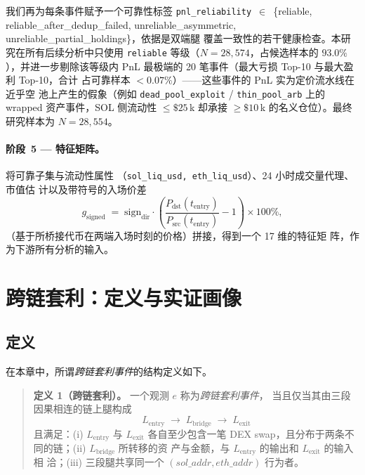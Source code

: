 \documentclass[11pt,a4paper]{ctexart}
\newcommand{\gsigned}{g_{\text{signed}}}
\begin{document}
我们再为每条事件赋予一个可靠性标签
\texttt{pnl\_reliability}~$\in$~\{reliable, reliable\_after\_dedup\_failed,
unreliable\_asymmetric, unreliable\_partial\_holdings\}，依据是双端腿
覆盖一致性的若干健康检查。本研究在所有后续分析中只使用 \texttt{reliable}
等级（$N=28{,}574$，占候选样本的 $93.0\%$），并进一步剔除该等级内
PnL 最极端的 20 笔事件（最大亏损 Top-10 与最大盈利 Top-10，合计
占可靠样本 $<\!0.07\%$）——这些事件的 PnL 实为定价流水线在近乎空
池上产生的假象（例如 \texttt{dead\_pool\_exploit} /
\texttt{thin\_pool\_arb} 上的 wrapped 资产事件，SOL 侧流动性
$\leq\!\$25$\,k 却承接 $\geq\!\$10$\,k 的名义仓位）。最终研究样本为
$N = 28{,}554$。

\paragraph{阶段~5 --- 特征矩阵。} 将可靠子集与流动性属性
（\texttt{sol\_liq\_usd, eth\_liq\_usd}）、24 小时成交量代理、市值估
计以及带符号的入场价差
\begin{equation}
\label{eq:ch4-gsigned}
    \gsigned \;=\; \mathrm{sign}_{\text{dir}}\cdot
    \left(\frac{P_{\text{dst}}(t_{\text{entry}})}{P_{\text{src}}(t_{\text{entry}})}-1\right)
    \times 100\%,
\end{equation}
（基于所桥接代币在两端入场时刻的价格）拼接，得到一个 17 维的特征矩
阵，作为下游所有分析的输入。

\section{跨链套利：定义与实证画像}
\label{sec:ch4-arbitrage}

\subsection{定义}

在本章中，所谓\emph{跨链套利事件}的结构定义如下。

\begin{quote}
\textbf{定义 1（跨链套利）。} 一个观测 $e$ 称为\textit{跨链套利事件}，
当且仅当其由三段因果相连的链上腿构成
\[
    L_{\text{entry}} \;\to\; L_{\text{bridge}} \;\to\; L_{\text{exit}}
\]
且满足：(i) $L_{\text{entry}}$ 与 $L_{\text{exit}}$ 各自至少包含一笔
DEX swap，且分布于两条不同的链；(ii) $L_{\text{bridge}}$ 所转移的资
产与金额，与 $L_{\text{entry}}$ 的输出和 $L_{\text{exit}}$ 的输入相
洽；(iii) 三段腿共享同一个 $(sol\_addr, eth\_addr)$ 行为者。
\end{quote}
\end{document}
